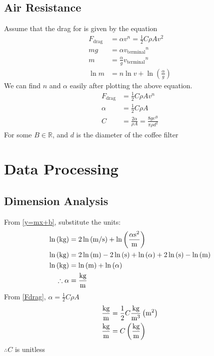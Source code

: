 \documentclass{article}
\begin{document}
\subsection{Air Resistance}
Assume that the drag for is given by the equation
\begin{align*}
    F_{\text{drag}}&=\alpha v^n=\frac 12C\rho Av^2\label{Fdrag}\tag{4}\\
    mg&=\alpha {v_\text{terminal}}^n\\
    m&=\frac{\alpha}{g}{v_\text{terminal}}^n\\
    \ln m&=n\ln v+\ln{\left(\frac{\alpha}{g}\right)}\label{y=mx+b}\tag{5}
\end{align*}
We can find $n$ and $\alpha$ easily after plotting the above equation.
\begin{align*}
    F_\text{drag}&=\frac 12C\rho Av^n\\
    \alpha &=\frac 12 C\rho A\\
    C&=\frac{2\alpha}{\rho A}=\frac{8ge^B}{\pi\rho d^2}
\end{align*}
For some $B\in\mathbb{R}$, and $d$ is the diameter of the coffee filter



\section{Data Processing}
\subsection{Dimension Analysis}
From \eqref{y=mx+b}, substitute the units:
\begin{align*}
    \ln\left(\text{kg}\right)&=2\ln\left(\text{m/s}\right)+\ln\left(\frac{\alpha \text{s}^2}{\text m}\right)\\
    \ln\left(\text{kg}\right)&=2\ln\left(\text m\right)-2\ln\left(\text s\right)+\ln\left(\alpha\right)+2\ln\left(\text s\right)-\ln\left(\text m\right)\\
    \ln\left(\text{kg}\right)&=\ln\left(\text m\right)+\ln\left(\alpha\right)\\
    \therefore \alpha&=\frac{\text{kg}}{\text m}
\end{align*}
From \eqref{Fdrag}, $\alpha=\frac 12C\rho A$
\begin{align*}
    \frac{\text{kg}}{\text m}&=\frac 12 C\frac{\text{kg}}{\text m^3}\left(\text m^2\right)\\
    \frac{\text{kg}}{\text m}&=C\left(\frac{\text{kg}}{\text m}\right)\\
\end{align*}
$\therefore C$ is unitless
\end{document}
